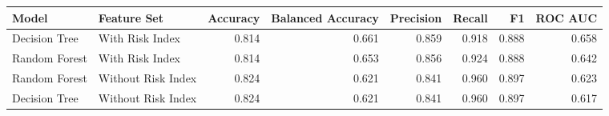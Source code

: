 \begin{tabular}{llrrrrrr}
\toprule
Model & Feature Set & Accuracy & Balanced Accuracy & Precision & Recall & F1 & ROC AUC \\
\midrule
Decision Tree & With Risk Index & 0.814 & 0.661 & 0.859 & 0.918 & 0.888 & 0.658 \\
Random Forest & With Risk Index & 0.814 & 0.653 & 0.856 & 0.924 & 0.888 & 0.642 \\
Random Forest & Without Risk Index & 0.824 & 0.621 & 0.841 & 0.960 & 0.897 & 0.623 \\
Decision Tree & Without Risk Index & 0.824 & 0.621 & 0.841 & 0.960 & 0.897 & 0.617 \\
\bottomrule
\end{tabular}
